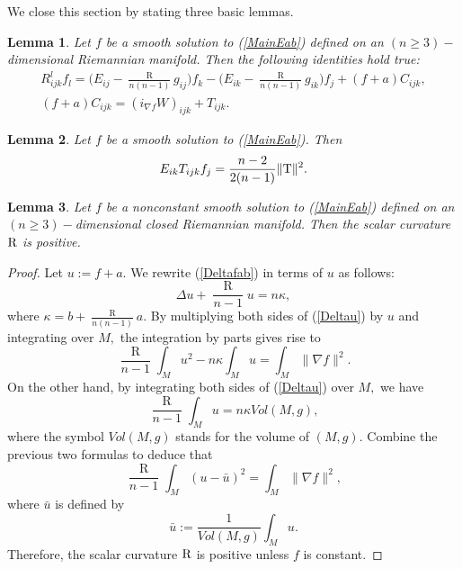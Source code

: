 \documentclass[10pt,leqno,oneside]{amsart}
\newtheorem{Lem}{Lemma}
\begin{document}
{                We close this section by stating three basic lemmas.

        \begin{Lem}\label{decomposeofR}
              Let $f$ be a smooth solution to {\rm(\ref{MainEab})} defined on an $(n\ge3)-$dimensional Riemannian manifold. Then the following identities hold true:
                         \begin{eqnarray}\label{RlijkflVSS}
                         &R_{ijk}^lf_{l}=\big(E_{ij}-\frac{\operatorname R}{n(n-1)}g_{ij}\big)f_{k}-\big(E_{ik}-\frac{\operatorname R}{n(n-1)}g_{ik}\big)f_{j}+(f+a)C_{ijk},&\\\label{fCVSS}
                         &(f+a)C_{ijk}=(i_{\nabla f}W)_{ijk}+T_{ijk}.&
                         \end{eqnarray}
        \end{Lem}

        \begin{Lem}\label{formforTfE}
              Let $f$ be a smooth solution to {\rm(\ref{MainEab})}. Then
             $$E_{ik}T_{ijk}f_{j}=\frac{n-2}{2(n-1)}\|{\rm T}\|^2.$$
        \end{Lem}

        \begin{Lem}\label{scalarPosi}
               Let $f$ be a nonconstant smooth solution to {\rm(\ref{MainEab})} defined on an $(n\ge3)-$dimensional closed Riemannian manifold. Then the scalar curvature ${\rm R}$ is positive.
        \end{Lem}
        \begin{proof}
               Let $u:=f+a.$ We rewrite (\ref{Deltafab}) in terms of $u$ as follows:
               \begin{equation}\label{Deltau}
                 \Delta u+\frac{\operatorname R}{n-1}u=n\kappa,
               \end{equation}
               where $\kappa=b+\frac{\operatorname R}{n(n-1)}a.$ By multiplying both sides of (\ref{Deltau}) by $u$ and integrating over $M,$ the integration by parts gives rise to
               \[\frac{\operatorname R}{n-1}\int_Mu^2-n\kappa\int_Mu=\int_M\|\nabla f\|^2.\]
               On the other hand, by integrating both sides of (\ref{Deltau}) over $M,$ we have
               \begin{equation}\label{Inu}
                 \frac{\operatorname R}{n-1}\int_Mu=n\kappa Vol(M,g),
               \end{equation}
               where the symbol $Vol(M,g)$ stands for the volume of $(M, g).$ Combine the previous two formulas to deduce that
               \[\frac{\operatorname R}{n-1}\int_M(u-\bar{u})^2=\int_M\|\nabla f\|^2,\]
               where $\bar{u}$ is defined by
               $$\bar{u}:=\frac{1}{Vol(M,g)}\int_Mu.$$
               Therefore, the scalar curvature ${\rm R}$ is positive unless $f$ is constant.
        \end{proof}

}
\end{document}

